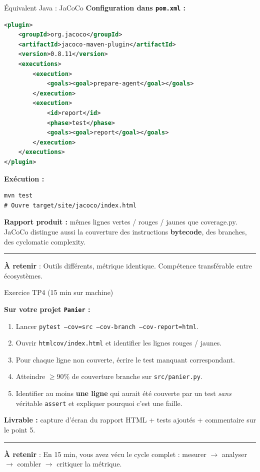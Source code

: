 \documentclass[aspectratio=169,11pt]{beamer}
\newcommand{\takeaway}[1]{%
\vfill\begin{beamercolorbox}[wd=\linewidth,sep=0.4em]{}
\color{accent2}\rule[0.6ex]{1.2em}{1.2pt}\hspace{0.4em}%
\textbf{\color{accent2}\small À retenir} \textcolor{textsoft}{:} %
{\small\color{textmain}#1}
\end{beamercolorbox}}
\begin{document}
\begin{frame}[fragile,t,shrink=10]{\'Equivalent Java : JaCoCo}
\footnotesize
\textbf{Configuration dans \texttt{pom.xml} :}
\begin{lstlisting}[style=javadark, language=XML]
<plugin>
    <groupId>org.jacoco</groupId>
    <artifactId>jacoco-maven-plugin</artifactId>
    <version>0.8.11</version>
    <executions>
        <execution>
            <goals><goal>prepare-agent</goal></goals>
        </execution>
        <execution>
            <id>report</id>
            <phase>test</phase>
            <goals><goal>report</goal></goals>
        </execution>
    </executions>
</plugin>
\end{lstlisting}
\vspace{0.3cm}
\textbf{Exécution :}
\begin{lstlisting}[style=bashdark]
mvn test
# Ouvre target/site/jacoco/index.html
\end{lstlisting}
\textbf{Rapport produit :} mêmes lignes vertes / rouges / jaunes que coverage.py. JaCoCo distingue aussi la couverture des instructions \textbf{bytecode}, des branches, des cyclomatic complexity.
\takeaway{Outils différents, métrique identique. Compétence transférable entre écosystèmes.}
\end{frame}

\begin{frame}[t,shrink=10]{Exercice TP4 (15 min sur machine)}
\begin{exercice}
\textbf{Sur votre projet \texttt{Panier} :}
\begin{enumerate}\itemsep0.1em
\item Lancer \texttt{pytest --cov=src --cov-branch --cov-report=html}.
\item Ouvrir \texttt{htmlcov/index.html} et identifier les lignes rouges / jaunes.
\item Pour chaque ligne non couverte, écrire le test manquant correspondant.
\item Atteindre \textbf{$\geq 90\%$} de couverture branche sur \texttt{src/panier.py}.
\item Identifier au moins \textbf{une ligne} qui aurait été couverte par un test \textit{sans} véritable \texttt{assert} et expliquer pourquoi c'est une faille.
\end{enumerate}
\vspace{0.4em}
\textbf{Livrable :} capture d'écran du rapport HTML + tests ajoutés + commentaire sur le point 5.
\end{exercice}
\takeaway{En 15 min, vous avez vécu le cycle complet : mesurer $\to$ analyser $\to$ combler $\to$ critiquer la métrique.}
\end{frame}
\end{document}
